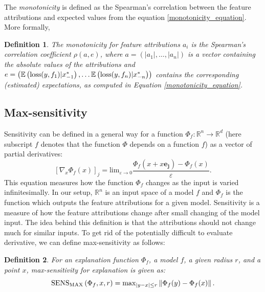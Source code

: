 \documentclass[magisterska,en]{pracamgr}
\newtheorem{defi}{Definition}[section]
\begin{document}
The \textit{monotonicity} is defined as the Spearman's correlation between the feature attributions and expected values from the equation \ref{monotonicity_equation}. More formally,

\begin{defi}
    The monotonicity for feature attributions $a_i$ is the Spearman’s correlation coefficient $\rho (a, e)$, where $a= \left(|a_1|, \ldots, |a_n|\right)$ is a vector containing the absolute values of the attributions and
    $e = \left(\mathbb{E}\left(\textup{loss}(y, f_1) | x_{-1}^*\right), \ldots \mathbb{E}\left(\textup{loss}(y, f_n) | x_{-n}^* \right) \right)$
contains the corresponding (estimated)
expectations, as computed in Equation \ref{monotonicity_equation}.
\end{defi}




\subsection{Max-sensitivity}
Sensitivity can be defined in a general way for a function $\Phi _f : \mathbb{R}^n \rightarrow \mathbb{R}^d$ (here subscript $f$ denotes that the function $\Phi$ depends on a function $f$) as a vector of partial derivatives:
\begin{equation}
    \left[ \nabla_{x} \Phi _{f}(x)\right]_j = \textrm{lim}_{\varepsilon \rightarrow 0} 
    \frac{\Phi _{f} (x + x \textbf{e}_{\textbf{j}} ) - \Phi_{f}(x)}
    {\varepsilon}.
\end{equation}
This equation measures how the function $\Phi _f$ changes as the input is varied infinitesimally.
In our setup, $\mathbb{R}^n$ is an input space of a model $f$ and $\Phi _f$ is the function which outputs the feature attributions for a given model. Sensitivity is a measure of how the feature attributions change after small changing of the model input. The idea behind this definition is that the attributions should not change much for similar inputs. To get rid of the potentially difficult to evaluate derivative, we can define max-sensitivity as follows:
\begin{defi}
    For an explanation function $\Phi _f $, a model $f$,  a given radius $r$, and a point $x$, max-sensitivity for explanation is given as:
    \begin{equation}
        \textup{SENS}_{\textup{MAX}} \left(\Phi _f, x, r \right) = \textup{max} _{|y-x| \leq r} \left\| \Phi _f(y) - \Phi _f(x)\right\|.
    \end{equation}
\end{defi}
\end{document}
